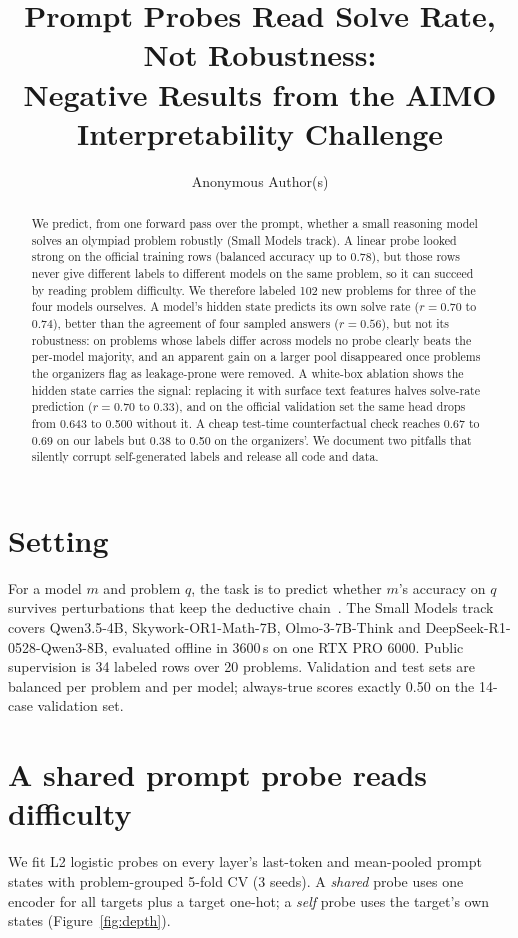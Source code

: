 \documentclass{article}
\title{Prompt Probes Read Solve Rate, Not Robustness:\\Negative Results from the AIMO Interpretability Challenge}
\author{Anonymous Author(s)}
\begin{document}
\maketitle

\begin{abstract}
We predict, from one forward pass over the prompt, whether a small reasoning model solves an olympiad problem robustly (Small Models track). A linear probe looked strong on the official training rows (balanced accuracy up to 0.78), but those rows never give different labels to different models on the same problem, so it can succeed by reading problem difficulty. We therefore labeled 102 new problems for three of the four models ourselves. A model's hidden state predicts its own solve rate ($r = 0.70$ to $0.74$), better than the agreement of four sampled answers ($r = 0.56$), but not its robustness: on problems whose labels differ across models no probe clearly beats the per-model majority, and an apparent gain on a larger pool disappeared once problems the organizers flag as leakage-prone were removed. A white-box ablation shows the hidden state carries the signal: replacing it with surface text features halves solve-rate prediction ($r = 0.70$ to $0.33$), and on the official validation set the same head drops from 0.643 to 0.500 without it. A cheap test-time counterfactual check reaches 0.67 to 0.69 on our labels but 0.38 to 0.50 on the organizers'. We document two pitfalls that silently corrupt self-generated labels and release all code and data.
\end{abstract}

\section{Setting}
For a model $m$ and problem $q$, the task is to predict whether $m$'s accuracy on $q$ survives perturbations that keep the deductive chain~\cite{stefanik2026aimointerp}. The Small Models track covers Qwen3.5-4B, Skywork-OR1-Math-7B, Olmo-3-7B-Think and DeepSeek-R1-0528-Qwen3-8B, evaluated offline in 3600\,s on one RTX PRO 6000. Public supervision is 34 labeled rows over 20 problems. Validation and test sets are balanced per problem and per model; always-true scores exactly 0.50 on the 14-case validation set.

\section{A shared prompt probe reads difficulty}
We fit L2 logistic probes on every layer's last-token and mean-pooled prompt states with problem-grouped 5-fold CV (3 seeds). A \emph{shared} probe uses one encoder for all targets plus a target one-hot; a \emph{self} probe uses the target's own states (Figure~\ref{fig:depth}).
\end{document}
